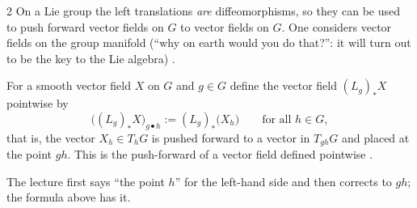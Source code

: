 \begin{paracol}{2}
On a Lie group the left translations \emph{are} diffeomorphisms, so they can be used to push forward vector fields on $G$ to vector fields on $G$. One considers vector fields on the group manifold (``why on earth would you do that?'': it will turn out to be the key to the Lie algebra)  .
\begin{definition}\label{def:ll-push-field}
For a smooth vector field $X$ on $G$ and $g\in G$ define the vector field $(L_g)_*X$ pointwise by
\[
  \bigl((L_g)_*X\bigr)_{g\bullet h}:=(L_g)_*\bigl(X_h\bigr)\qquad\text{for all }h\in G,
\]
that is, the vector $X_h\in T_hG$ is pushed forward to a vector in $T_{gh}G$ and placed at the point $gh$. This is the push-forward of a vector field defined pointwise    .
\end{definition}
\begin{coursenote}
The lecture first says ``the point $h$'' for the left-hand side and then corrects to $gh$; the formula above has it. 
\end{coursenote}


\end{paracol}
